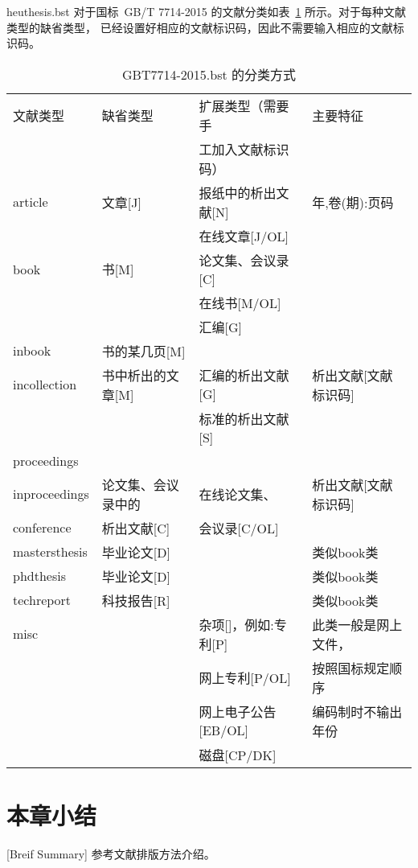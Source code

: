 heuthesis.bst 对于国标~GB/T 7714-2015 的文献分类如表~\ref{tab:entrytypes} 所示。对于每种文献类型的缺省类型，
已经设置好相应的文献标识码，因此不需要输入相应的文献标识码。

\begin{table}[htbp]
  \caption{GBT7714-2015.bst 的分类方式}
  \label{tab:entrytypes}
  \vspace{0.5em}\centering\wuhao
  \begin{tabular}{llll}
    \toprule[1.5pt]
    文献类型      & 缺省类型           & 扩展类型（需要手     & 主要特征             \\
                  &                    & 工加入文献标识码）   &                      \\
    \midrule[1pt]
    article       & 文章[J]            & 报纸中的析出文献[N]  & 年,卷(期):页码       \\
                  &                    & 在线文章[J/OL]       &                      \\
    book          & 书[M]              & 论文集、会议录[C]    &                      \\
                  &                    & 在线书[M/OL]         &                      \\
                  &                    & 汇编[G]              &                      \\
    inbook        & 书的某几页[M]      &                      &                      \\
    incollection  & 书中析出的文章[M]  & 汇编的析出文献[G]    & 析出文献[文献标识码] \\
                  &                    & 标准的析出文献[S]    &                      \\
    proceedings   &                    &                      &                      \\
    inproceedings & 论文集、会议录中的 & 在线论文集、         & 析出文献[文献标识码] \\
    conference    & 析出文献[C]        & 会议录[C/OL]         &                      \\
    mastersthesis & 毕业论文[D]        &                      & 类似book类           \\
    phdthesis     & 毕业论文[D]        &                      & 类似book类           \\
    techreport    & 科技报告[R]        &                      & 类似book类           \\
    misc          &                    & 杂项[]，例如:专利[P] & 此类一般是网上文件， \\
                  &                    & 网上专利[P/OL]       & 按照国标规定顺序     \\
                  &                    & 网上电子公告[EB/OL]  & 编码制时不输出年份   \\
                  &                    & 磁盘[CP/DK]          &                      \\
    \bottomrule[1.5pt]
  \end{tabular}
\end{table}

\section*{本章小结}[Breif Summary]
参考文献排版方法介绍。

